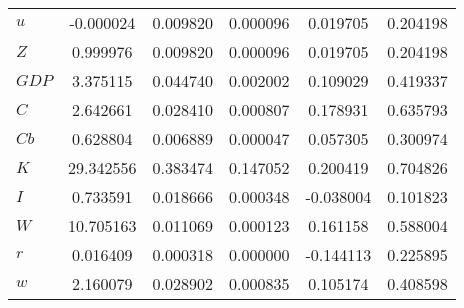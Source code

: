 \begin{center}
\begin{longtable}{lccccc}
$u         $	 & 	       -0.000024	 & 	        0.009820	 & 	        0.000096	 & 	        0.019705	 & 	        0.204198 \\ 
$Z         $	 & 	        0.999976	 & 	        0.009820	 & 	        0.000096	 & 	        0.019705	 & 	        0.204198 \\ 
$GDP       $	 & 	        3.375115	 & 	        0.044740	 & 	        0.002002	 & 	        0.109029	 & 	        0.419337 \\ 
$C         $	 & 	        2.642661	 & 	        0.028410	 & 	        0.000807	 & 	        0.178931	 & 	        0.635793 \\ 
$Cb        $	 & 	        0.628804	 & 	        0.006889	 & 	        0.000047	 & 	        0.057305	 & 	        0.300974 \\ 
$K         $	 & 	       29.342556	 & 	        0.383474	 & 	        0.147052	 & 	        0.200419	 & 	        0.704826 \\ 
$I         $	 & 	        0.733591	 & 	        0.018666	 & 	        0.000348	 & 	       -0.038004	 & 	        0.101823 \\ 
$W         $	 & 	       10.705163	 & 	        0.011069	 & 	        0.000123	 & 	        0.161158	 & 	        0.588004 \\ 
$r         $	 & 	        0.016409	 & 	        0.000318	 & 	        0.000000	 & 	       -0.144113	 & 	        0.225895 \\ 
$w         $	 & 	        2.160079	 & 	        0.028902	 & 	        0.000835	 & 	        0.105174	 & 	        0.408598 \\ 
\end{longtable}
 \end{center}

